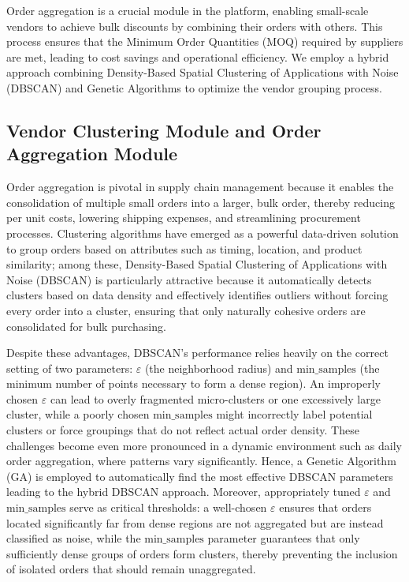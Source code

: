 Order aggregation is a crucial module in the platform, enabling small-scale vendors to achieve bulk discounts by combining their orders with others. This process ensures that the Minimum Order Quantities (MOQ) required by suppliers are met, leading to cost savings and operational efficiency. We employ a hybrid approach combining Density-Based Spatial Clustering of Applications with Noise (DBSCAN) and Genetic Algorithms to optimize the vendor grouping process.

\subsection{Vendor Clustering Module and Order Aggregation Module}

Order aggregation is pivotal in supply chain management because it enables the consolidation of multiple small orders into a larger, bulk order, thereby reducing per unit costs, lowering shipping expenses, and streamlining procurement processes. Clustering algorithms have emerged as a powerful data-driven solution to group orders based on attributes such as timing, location, and product similarity; among these, Density-Based Spatial Clustering of Applications with Noise (DBSCAN) is particularly attractive because it automatically detects clusters based on data density and effectively identifies outliers without forcing every order into a cluster, ensuring that only naturally cohesive orders are consolidated for bulk purchasing.

Despite these advantages, DBSCAN's performance relies heavily on the correct setting of two parameters: $\varepsilon$ (the neighborhood radius) and $\text{min\_samples}$ (the minimum number of points necessary to form a dense region). An improperly chosen $\varepsilon$ can lead to overly fragmented micro-clusters or one excessively large cluster, while a poorly chosen $\text{min\_samples}$ might incorrectly label potential clusters or force groupings that do not reflect actual order density. These challenges become even more pronounced in a dynamic environment such as daily order aggregation, where patterns vary significantly. Hence, a Genetic Algorithm (GA) is employed to automatically find the most effective DBSCAN parameters leading to the hybrid DBSCAN approach. Moreover, appropriately tuned $\varepsilon$ and $\text{min\_samples}$ serve as critical thresholds: a well-chosen $\varepsilon$ ensures that orders located significantly far from dense regions are not aggregated but are instead classified as noise, while the $\text{min\_samples}$ parameter guarantees that only sufficiently dense groups of orders form clusters, thereby preventing the inclusion of isolated orders that should remain unaggregated.

